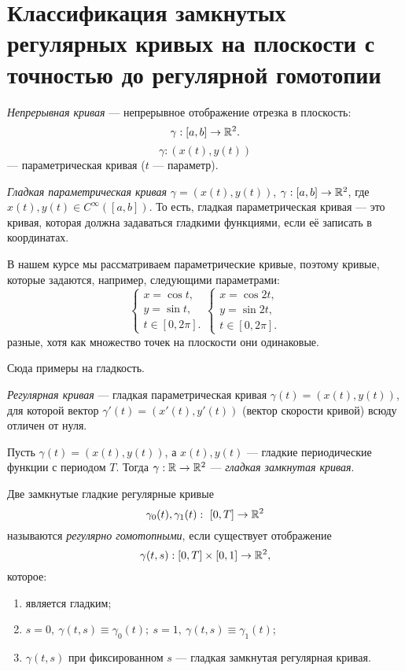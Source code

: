 \section{Классификация замкнутых регулярных кривых на плоскости с точностью до регулярной гомотопии}

\begin{definition}
    \textit{Непрерывная кривая} — непрерывное отображение отрезка в плоскость: $$\gamma: [a,b] \to \mathbb{R}^2.$$
    $$\gamma: (x(t), y(t))$$ — параметрическая кривая ($t$ — параметр).
\end{definition} 

\begin{definition}
    \textit{Гладкая параметрическая кривая} $\gamma = (x(t), y(t))$, $\gamma: [a,b] \to \mathbb{R}^2$, где $x(t), y(t) \in C^{\infty}([a,b])$. То есть, гладкая параметрическая кривая — это кривая, которая должна задаваться гладкими функциями, если её записать в координатах.
\end{definition}

В нашем курсе мы рассматриваем параметрические кривые, поэтому кривые, которые задаются, например, следующими параметрами:
$$\begin{cases}
    x = \cos{t}, \\
    y = \sin{t}, \\
    t \in [0, 2 \pi].
\end{cases}
\begin{cases}
    x = \cos{2t}, \\
    y = \sin{2t}, \\
    t \in [0, 2 \pi].
\end{cases}$$
разные, хотя как множество точек на плоскости они одинаковые.

Сюда примеры на гладкость.


\begin{definition}
    \textit{Регулярная кривая} — гладкая параметрическая кривая $\gamma(t) = (x(t), y(t))$, для которой вектор $\gamma'(t) = (x'(t), y'(t))$ (вектор скорости кривой) всюду отличен от нуля.
\end{definition}

\begin{definition}
    Пусть $\gamma(t) = (x(t), y(t))$, а $x(t), y(t)$ — гладкие периодические функции с периодом $T$. Тогда $\gamma: \mathbb{R} \to \mathbb{R}^2$ — \textit{гладкая замкнутая кривая}.
\end{definition} 

\begin{definition}
    Две замкнутые гладкие регулярные кривые $$\gamma_0(t), \gamma_1(t): \ [0, T] \to \mathbb{R}^2$$ называются \textit{регулярно гомотопными}, если существует отображение $$\gamma(t,s): [0, T] \times [0,1] \to \mathbb{R}^2,$$ которое:
    \begin{enumerate}
        \item является гладким;
        \item $s = 0, \ \gamma(t,s) \equiv \gamma_0(t); \ s = 1,\ \gamma(t,s) \equiv \gamma_1(t)$;
        \item $\gamma(t,s)$ при фиксированном $s$ — гладкая замкнутая регулярная кривая.
    \end{enumerate}
\end{definition} 

